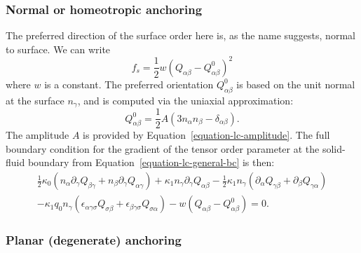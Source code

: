 \subsubsection{Normal or homeotropic anchoring}
The preferred direction of the surface order here is, as the name
suggests, normal to surface. We can write
\begin{equation}
f_s = {\textstyle\frac{1}{2}} w (Q_{\alpha\beta} - Q_{\alpha\beta}^0)^2
\end{equation}
where $w$ is a constant.
The preferred orientation $Q^0_{\alpha\beta}$ is based on the unit normal
at the surface $n_\gamma$, and is computed via the uniaxial approximation:
\begin{equation}
Q^0_{\alpha\beta}
= {\textstyle \frac{1}{2}} A (3n_\alpha n_\beta - \delta_{\alpha\beta}).
\end{equation}
The amplitude $A$ is provided by Equation~\ref{equation-lc-amplitude}. The
full boundary condition for the gradient of the tensor order parameter
at the solid-fluid boundary from Equation~\ref{equation-lc-general-bc}
is then:
\begin{eqnarray}
{\textstyle\frac{1}{2}} \kappa_0 (n_\alpha \partial_\gamma Q_{\beta\gamma}
+ n_\beta \partial_\gamma Q_{\alpha\gamma})
+ \kappa_1 n_\gamma \partial_\gamma Q_{\alpha\beta}
- {\textstyle\frac{1}{2}} \kappa_1 n_\gamma ( \partial_\alpha Q_{\gamma\beta}
+ \partial_\beta Q_{\gamma\alpha})
\nonumber
\\
- \kappa_1 q_0 n_\gamma (\epsilon_{\alpha\gamma\sigma} Q_{\sigma\beta}
+ \epsilon_{\beta\gamma\sigma}Q_{\sigma\alpha})
- w(Q_{\alpha\beta} - Q_{\alpha\beta}^0) = 0.
\label{equation-lc-bc-normal}
\end{eqnarray}

\subsubsection{Planar (degenerate) anchoring}

